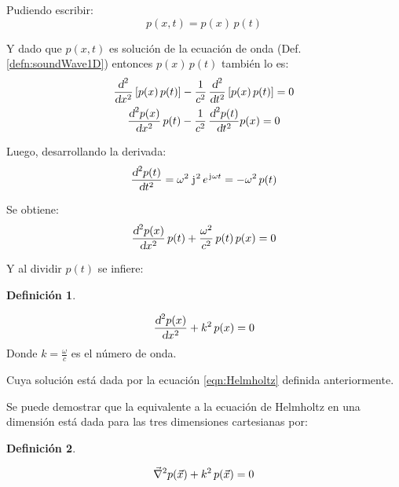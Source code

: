 \documentclass[a5paper,12pt,twoside]{book}
\newtheorem{defn}{{Definición}}[chapter]
\begin{document}
Pudiendo escribir:
\begin{equation*}
    p(x,t) = p(x) \, p(t)
\end{equation*}

Y dado que $p(x,t)$ es solución de la ecuación de onda (Def. \ref{defn:soundWave1D}) entonces $p(x) \, p(t)$ también lo es:
\begin{gather*}
    \frac{\textsl{d}^2}{\textsl{d} x^2} \left[ p(x) \, p(t) \right] - \frac{1}{c^2} \, \frac{\textsl{d}^2}{\textsl{d} t^2} \left[ p(x) \, p(t) \right] = 0
    \\
    \frac{\textsl{d}^2 p(x)}{\textsl{d} x^2} \, p(t) - \frac{1}{c^2} \, \frac{\textsl{d}^2 p(t)}{\textsl{d} t^2} p(x) = 0
\end{gather*}

Luego, desarrollando la derivada:
\begin{equation*}
    \frac{\textsl{d}^2 p(t)}{\textsl{d} t^2} = \omega^2 \, \mkern2mu\mathrm{j}\mkern1mu^2 \, e^{\mkern2mu\mathrm{j}\mkern1mu \omega t} = - \omega^2 \, p(t)
\end{equation*}

Se obtiene:
\begin{equation*}
    \frac{\textsl{d}^2 p(x)}{\textsl{d} x^2} \, p(t) + \frac{\omega^2}{c^2} \, p(t) \, p(x) = 0
\end{equation*}

Y al dividir $p(t)$ se infiere:

\begin{mdframed}[style=DefinitionFrame]
    \begin{defn}
        \label{defn:Helmholtz1D}
    \end{defn}
    \begin{equation*}
        \frac{\textsl{d}^2 p(x)}{\textsl{d} x^2} + k^2 \, p(x) = 0
    \end{equation*}
    Donde $k=\frac{\omega}{c}$ es el número de onda.
\end{mdframed}

Cuya solución está dada por la ecuación \ref{eqn:Helmholtz} definida anteriormente.

Se puede demostrar que la equivalente a la ecuación de Helmholtz en una dimensión está dada para las tres dimensiones cartesianas por:

\begin{mdframed}[style=DefinitionFrame]
    \begin{defn}
        \label{defn:Helmholtz3D}
    \end{defn}
    \begin{equation*}
        \Vec{\nabla}^2 p(\Vec{x}) + k^2 \, p(\Vec{x}) = 0
    \end{equation*}
\end{mdframed}
\end{document}
